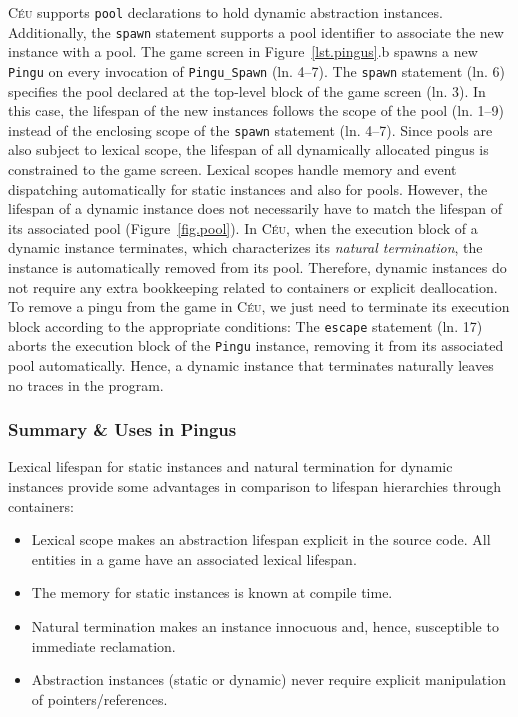 \documentclass{vgtc}                          %
\newcommand{\CEU}{\textsc{C\'{e}u}\xspace}
\newcommand{\code}[1] {{\small{\texttt{#1}}}}
\begin{document}
\CEU supports \code{pool} declarations to hold dynamic abstraction instances.
Additionally, the \code{spawn} statement supports a pool identifier to
associate the new instance with a pool.
%
The game screen in Figure~\ref{lst.pingus}.b spawns a new \code{Pingu} on every
invocation of \code{Pingu\_Spawn} (ln. 4--7).
%
The \code{spawn} statement (ln. 6) specifies the pool declared at the top-level
block of the game screen (ln. 3).
In this case, the lifespan of the new instances follows the scope of the pool
(ln. 1--9) instead of the enclosing scope of the \code{spawn} statement
(ln. 4--7).
Since pools are also subject to lexical scope, the lifespan of all dynamically
allocated pingus is constrained to the game screen.
%
Lexical scopes handle memory and event dispatching automatically for static
instances and also for pools.
However, the lifespan of a dynamic instance does not necessarily have to match
the lifespan of its associated pool (Figure~\ref{fig.pool}).
In \CEU, when the execution block of a dynamic instance terminates, which
characterizes its \emph{natural termination}, the instance is automatically
removed from its pool.
Therefore, dynamic instances do not require any extra bookkeeping related to 
containers or explicit deallocation.
%
To remove a pingu from the game in \CEU, we just need to terminate its execution
block according to the appropriate conditions:
%
The \code{escape} statement (ln. 17) aborts the execution block of the
\code{Pingu} instance, removing it from its associated pool automatically.
Hence, a dynamic instance that terminates naturally leaves no traces in the 
program.

\subsubsection{Summary \& Uses in Pingus}

Lexical lifespan for static instances and natural termination for dynamic
instances provide some advantages in comparison to lifespan hierarchies through
containers:

\begin{itemize}
\item Lexical scope makes an abstraction lifespan explicit in the source code.
      All entities in a game have an associated lexical lifespan.
\item The memory for static instances is known at compile time.
\item Natural termination makes an instance innocuous and, hence, susceptible
      to immediate reclamation.
\item Abstraction instances (static or dynamic) never require explicit
      manipulation of pointers/references.
\end{itemize}
\end{document}
